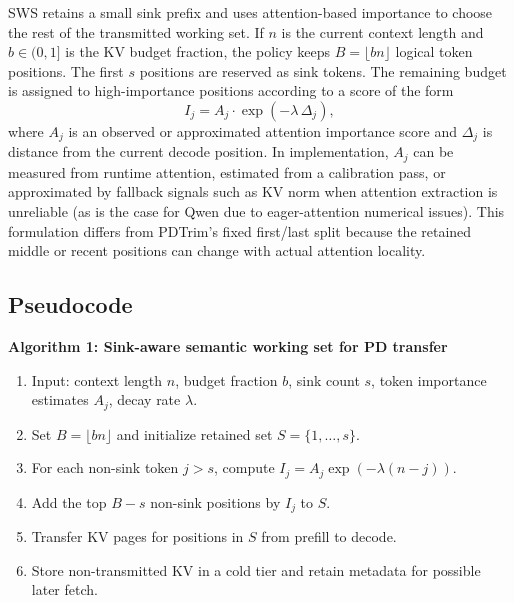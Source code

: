\documentclass[11pt]{article}
\newcommand{\method}{SWS}
\theoremstyle{definition}
\theoremstyle{plain}
\begin{document}
\method{} retains a small sink prefix and uses attention-based importance to choose the rest of the transmitted working set.  If $n$ is the current context length and $b\in(0,1]$ is the KV budget fraction, the policy keeps $B=\lfloor b n\rfloor$ logical token positions.  The first $s$ positions are reserved as sink tokens.  The remaining budget is assigned to high-importance positions according to a score of the form
\begin{equation}
  I_j = A_j \cdot \exp(-\lambda \, \Delta_j),
\end{equation}
where $A_j$ is an observed or approximated attention importance score and $\Delta_j$ is distance from the current decode position.  In implementation, $A_j$ can be measured from runtime attention, estimated from a calibration pass, or approximated by fallback signals such as KV norm when attention extraction is unreliable (as is the case for Qwen due to eager-attention numerical issues).  This formulation differs from PDTrim's fixed first/last split because the retained middle or recent positions can change with actual attention locality.

\subsection{Pseudocode}
\begin{center}
\begin{minipage}{0.94\linewidth}
\small
\textbf{Algorithm 1: Sink-aware semantic working set for PD transfer}
\begin{enumerate}[leftmargin=1.8em,itemsep=2pt]
  \item Input: context length $n$, budget fraction $b$, sink count $s$, token importance estimates $A_j$, decay rate $\lambda$.
  \item Set $B=\lfloor b n\rfloor$ and initialize retained set $S=\{1,\ldots,s\}$.
  \item For each non-sink token $j>s$, compute $I_j=A_j\exp(-\lambda(n-j))$.
  \item Add the top $B-s$ non-sink positions by $I_j$ to $S$.
  \item Transfer KV pages for positions in $S$ from prefill to decode.
  \item Store non-transmitted KV in a cold tier and retain metadata for possible later fetch.
\end{enumerate}
\end{minipage}
\end{center}
\end{document}
